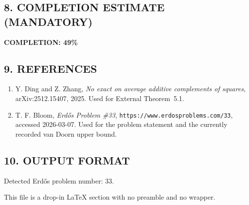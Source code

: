 \subsection*{8. COMPLETION ESTIMATE (MANDATORY)}

\textbf{COMPLETION: 49\%}

\subsection*{9. REFERENCES}

\begin{enumerate}
\item Y. Ding and Z. Zhang, \emph{No exact on average additive complements of squares}, arXiv:2512.15407, 2025. Used for External Theorem~5.1.
\item T. F. Bloom, \emph{Erd\H{o}s Problem \#33}, \texttt{https://www.erdosproblems.com/33}, accessed 2026-03-07. Used for the problem statement and the currently recorded van Doorn upper bound.
\end{enumerate}

\subsection*{10. OUTPUT FORMAT}

Detected Erd\H{o}s problem number: \(33\).

This file is a drop-in LaTeX section with no preamble and no \verb|| wrapper.
